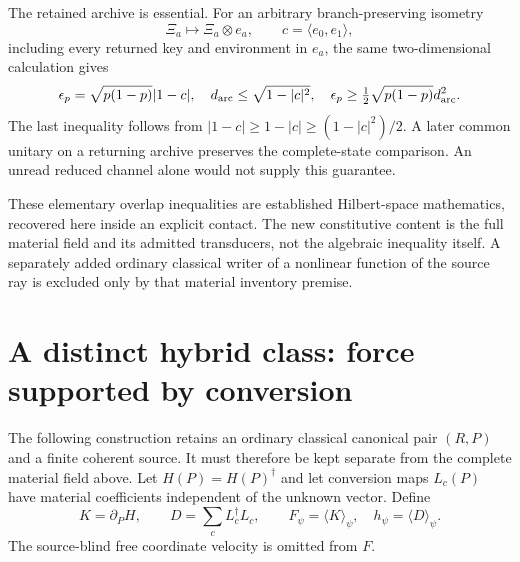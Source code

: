 \documentclass[11pt,oneside,openany]{book}
\theoremstyle{definition}
\theoremstyle{remark}\newtheorem{remark}[theorem]{Remark}
\begin{document}
The retained archive is essential. For an arbitrary branch-preserving isometry
\[
 \Xi_a\longmapsto\Xi_a\otimes e_a,
 \qquad c=\langle e_0,e_1\rangle,
\]
including every returned key and environment in $e_a$, the same two-dimensional calculation gives
\begin{equation}
 \epsilon_p=\sqrt{p(1-p)}|1-c|,
 \quad d_{\rm arc}\le\sqrt{1-|c|^2},
 \quad \epsilon_p\ge\tfrac12\sqrt{p(1-p)}d_{\rm arc}^2.
 \label{mat:allarchives}
\end{equation}
The last inequality follows from $|1-c|\ge1-|c|\ge(1-|c|^2)/2$. A later common unitary on a returning archive preserves the complete-state comparison. An unread reduced channel alone would not supply this guarantee.

These elementary overlap inequalities are established Hilbert-space mathematics, recovered here inside an explicit contact. The new constitutive content is the full material field and its admitted transducers, not the algebraic inequality itself. A separately added ordinary classical writer of a nonlinear function of the source ray is excluded only by that material inventory premise.

\section{A distinct hybrid class: force supported by conversion}

The following construction retains an ordinary classical canonical pair $(R,P)$ and a finite coherent source. It must therefore be kept separate from the complete material field above. Let $H(P)=H(P)^\dagger$ and let conversion maps $L_c(P)$ have material coefficients independent of the unknown vector. Define
\begin{equation}
 K=\partial_PH,\qquad D=\sum_cL_c^\dagger L_c,
 \qquad F_\psi=\langle K\rangle_\psi,\quad h_\psi=\langle D\rangle_\psi.
 \label{mat:KD}
\end{equation}
The source-blind free coordinate velocity is omitted from $F$.
\end{document}
